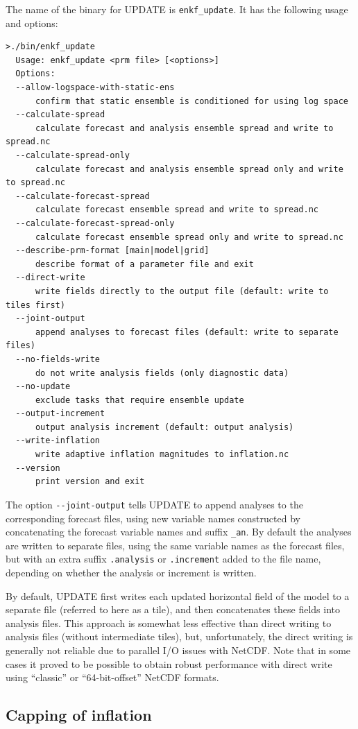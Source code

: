 \documentclass[11pt]{report}
\begin{document}
The name of the binary for UPDATE is \verb|enkf_update|.
It has the following usage and options:
\begin{Verbatim}[frame=single,fontsize=\footnotesize]
>./bin/enkf_update
  Usage: enkf_update <prm file> [<options>]
  Options:
  --allow-logspace-with-static-ens
      confirm that static ensemble is conditioned for using log space
  --calculate-spread
      calculate forecast and analysis ensemble spread and write to spread.nc
  --calculate-spread-only
      calculate forecast and analysis ensemble spread only and write to spread.nc
  --calculate-forecast-spread
      calculate forecast ensemble spread and write to spread.nc
  --calculate-forecast-spread-only
      calculate forecast ensemble spread only and write to spread.nc
  --describe-prm-format [main|model|grid]
      describe format of a parameter file and exit
  --direct-write
      write fields directly to the output file (default: write to tiles first)
  --joint-output
      append analyses to forecast files (default: write to separate files)
  --no-fields-write
      do not write analysis fields (only diagnostic data)
  --no-update
      exclude tasks that require ensemble update
  --output-increment
      output analysis increment (default: output analysis)
  --write-inflation
      write adaptive inflation magnitudes to inflation.nc
  --version
      print version and exit
\end{Verbatim}

The option \verb|--joint-output| tells UPDATE to append analyses to the corresponding forecast files, using new variable names constructed by concatenating the forecast variable names and suffix \verb|_an|.
By default the analyses are written to separate files, using the same variable names as the forecast files, but with an extra suffix \verb|.analysis| or \verb|.increment| added to the file name, depending on whether the analysis or increment is written.

By default, UPDATE first writes each updated horizontal field of the model to a separate file (referred to here as a tile), and then concatenates these fields into analysis files.
This approach is somewhat less effective than direct writing to analysis files (without intermediate tiles), but, unfortunately, the direct writing is generally not reliable due to parallel I/O issues with NetCDF.
Note that in some cases it proved to be possible to obtain robust performance with direct write using ``classic'' or ``64-bit-offset'' NetCDF formats.

\subsection{Capping of inflation}
\label{sec:capping}
\end{document}

